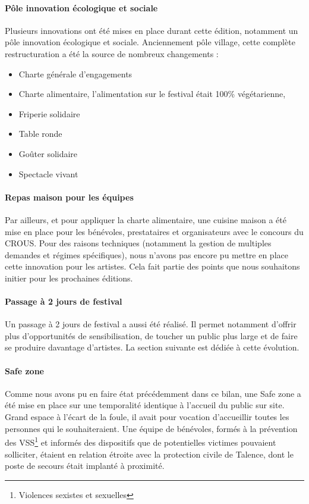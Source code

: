 \documentclass[12pt,a4paper]{report}
\begin{document}
\paragraph{Pôle innovation écologique et sociale}
Plusieurs innovations ont été mises en place durant cette édition, notamment un pôle innovation écologique et sociale. Anciennement pôle village, cette complète restructuration a été la source de nombreux changements : 
\begin{itemize}
\item Charte générale d’engagements
\item Charte alimentaire, l'alimentation sur le festival était 100\% végétarienne,
\item Friperie solidaire
\item Table ronde
\item Goûter solidaire
\item Spectacle vivant
\end{itemize}

\paragraph{Repas maison pour les équipes}
Par ailleurs, et pour appliquer la charte alimentaire, une cuisine maison a été mise en place pour les bénévoles, prestataires et organisateurs avec le concours du CROUS. Pour des raisons techniques (notamment la gestion de multiples demandes et régimes spécifiques), nous n'avons pas encore pu mettre en place cette innovation pour les artistes. Cela fait partie des points que nous souhaitons initier pour les prochaines éditions.

\paragraph{Passage à 2 jours de festival}
Un passage à 2 jours de festival a aussi été réalisé. Il permet notamment d'offrir plus d'opportunités de sensibilisation, de toucher un public plus large et de faire se produire davantage d'artistes. La section suivante est dédiée à cette évolution.

\paragraph{Safe zone}
Comme nous avons pu en faire état précédemment dans ce bilan, une \og Safe zone \fg{} a été mise en place sur une temporalité identique à l'accueil du public sur site. Grand espace à l'écart de la foule, il avait pour vocation d'accueillir toutes les personnes qui le souhaiteraient. Une équipe de bénévoles, formés à la prévention des VSS\footnote{Violences sexistes et sexuelles} et informés des dispositifs que de potentielles victimes pouvaient solliciter, étaient en relation étroite avec la protection civile de Talence, dont le poste de secours était implanté à proximité. 
\end{document}
